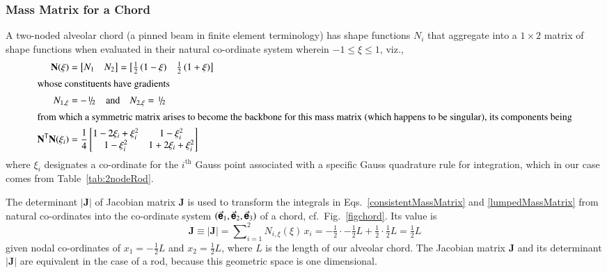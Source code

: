 \subsubsection{Mass Matrix for a Chord}

A two-noded alveolar chord (a pinned beam in finite element terminology) has shape functions $N_i$ that aggregate into a $1 \! \times \! 2$ matrix of shape functions when evaluated in their natural co-ordinate system wherein $-1 \leq \xi \leq 1$, viz.,
\begin{subequations}
    \begin{align}
    \mathbf{N} (\xi) & = \bigl[ \begin{matrix} N_1 & N_2 \end{matrix} \bigr] =
    \bigl[ \begin{matrix}
    \frac{1}{2} \, (1 - \xi) &  \frac{1}{2} \, (1 + \xi)
    \end{matrix} \bigr] \\
    \intertext{whose constituents have gradients}
    N_{1,\xi} & = -\textfrac{1}{2} 
    \quad \text{and} \quad
    N_{2,\xi} = \textfrac{1}{2} \\
    \intertext{from which a symmetric matrix arises to become the backbone for this mass matrix (which happens to be singular), its components being}
    \mathbf{N}^{\mathsf{T}} \mathbf{N} (\xi_i) & = \frac{1}{4} \begin{bmatrix}
    1 - 2\xi_i + \xi_i^2 & 1 - \xi_i^2 \\
    1 - \xi_i^2 & 1 + 2 \xi_i + \xi_i^2    
    \end{bmatrix} 
    \end{align}
\end{subequations}
where $\xi_i$ designates a co-ordinate for the $i^{\mathrm{th}}$ Gauss point associated with a specific Gauss quadrature rule for integration, which in our case comes from Table~\ref{tab:2nodeRod}.

The determinant $| \mathbf{J} |$ of Jacobian matrix $\mathbf{J}$ is used to transform the integrals in Eqs.~\ref{consistentMassMatrix} and \ref{lumpedMassMatrix} from natural co-ordinates into the co-ordinate system $( \vec{\boldsymbol{\mathsf{e}}}_1 , \vec{\boldsymbol{\mathsf{e}}}_2 , \vec{\boldsymbol{\mathsf{e}}}_3 )$ of a chord, cf.\ Fig.~\ref{figchord}.  Its value is
\begin{equation}
\mathbf{J} \equiv | \mathbf{J} | = \sum\nolimits_{i=1}^2 N_{i,\xi} (\xi) \, x_i = 
-\tfrac{1}{2} \cdot -\tfrac{1}{2} L + \tfrac{1}{2} \cdot \tfrac{1}{2} L = 
\tfrac{1}{2} L
\label{detJac1D}
\end{equation}
given nodal co-ordinates of $x_1 = -\tfrac{1}{2} L$ and $x_2 = \tfrac{1}{2} L$, where $L$ is the length of our alveolar chord.  The Jacobian matrix $\mathbf{J}$ and its determinant $| \mathbf{J} |$ are equivalent in the case of a rod, because this geometric space is one dimensional. 

